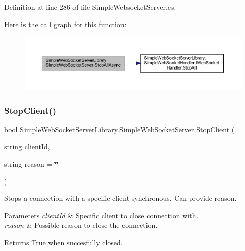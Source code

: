 Definition at line 286 of file Simple\+Websocket\+Server.\+cs.

Here is the call graph for this function\+:
\nopagebreak
\begin{figure}[H]
\begin{center}
\leavevmode
\includegraphics[width=350pt]{class_simple_web_socket_server_library_1_1_simple_web_socket_server_a1bb139b6266636ee732e584926844fdf_cgraph}
\end{center}
\end{figure}
\mbox{\label{class_simple_web_socket_server_library_1_1_simple_web_socket_server_a15254218104e0b1a6af5363c7b0810a6}} 
\subsubsection{\texorpdfstring{Stop\+Client()}{StopClient()}}
{\footnotesize\ttfamily bool Simple\+Web\+Socket\+Server\+Library.\+Simple\+Web\+Socket\+Server.\+Stop\+Client (\begin{DoxyParamCaption}\item[{string}]{client\+Id,  }\item[{string}]{reason = {\ttfamily \char`\"{}\char`\"{}} }\end{DoxyParamCaption})}



Stops a connection with a specific client synchronous. Can provide reason. 


\begin{DoxyParams}{Parameters}
{\em client\+Id} & Specific client to close connection with.\\
\hline
{\em reason} & Possible reason to close the connection.\\
\hline
\end{DoxyParams}
\begin{DoxyReturn}{Returns}
True when succesfully closed.
\end{DoxyReturn}


